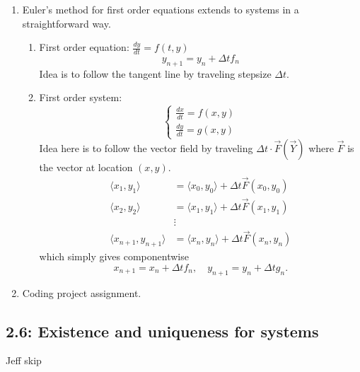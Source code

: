\documentclass{article}
\begin{document}
\begin{enumerate}

\item Euler's method for first order equations extends to systems in a straightforward way.
\begin{enumerate}
\item First order equation: $\frac{dy}{dt} = f(t,y)$
\[
y_{n+1} = y_n + \Delta t f_n
\]
Idea is to follow the tangent line by traveling stepsize $\Delta t$.
\item First order system: 
\[
\begin{cases}
\frac{dx}{dt} = f(x,y) \\
\frac{dy}{dt} = g(x,y) 
\end{cases}
\]
Idea here is to follow the vector field by traveling $\Delta t \cdot \vec{F}(\vec{Y})$ where $\vec{F}$ is the vector at location $(x,y)$. \begin{align*}
\langle x_1,y_1 \rangle &= \langle x_0,y_0 \rangle + \Delta t \vec{F}(x_0, y_0) \\
\langle x_2,y_2 \rangle &= \langle x_1,y_1 \rangle + \Delta t \vec{F}(x_1, y_1) \\
& \vdots \\
\langle x_{n+1},y_{n+1} \rangle &= \langle x_n,y_n \rangle + \Delta t \vec{F}(x_n, y_n)
\end{align*}
which simply gives componentwise
\[
x_{n+1} = x_n + \Delta t f_n, \quad y_{n+1} = y_n + \Delta t g_n.
\]
\end{enumerate}

\item Coding project assignment.

\end{enumerate}

\subsection{2.6: Existence and uniqueness for systems}
Jeff skip
\end{document}
